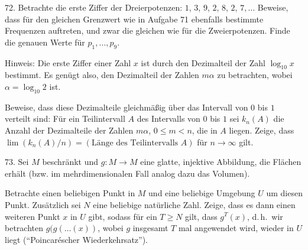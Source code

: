 \begin{problem}{72.}
	Betrachte die erste Ziffer der Dreierpotenzen: $1$, $3$, $9$, $2$, $8$, $2$, $7, \dotsc$ Beweise, dass für den gleichen Grenzwert wie in Aufgabe 71 ebenfalls bestimmte Frequenzen auftreten, und zwar die gleichen wie für die Zweierpotenzen. Finde die genauen Werte für $p_1, \dotsc, p_9$.
	\begin{note}{Hinweis:}
		Die erste Ziffer einer Zahl $x$ ist durch den Dezimalteil der Zahl $\log_{10} x$ bestimmt. Es genügt also, den Dezimalteil der Zahlen $m \alpha$ zu betrachten, wobei $\alpha=\log_{10} 2$ ist.
	\end{note}
	Beweise, dass diese Dezimalteile gleichmäßig über das Intervall von $0$ bis $1$ verteilt sind: Für ein Teilintervall $A$ des Intervalls von $0$ bis $1$ sei $k_n(A)$ die Anzahl der Dezimalteile der Zahlen $m\alpha$, $0 \leqslant m < n$, die in $A$ liegen. Zeige, dass $\lim(k_n(A)/n)=(\text{Länge des Teilintervalls $A$})$ für $n\rightarrow \infty$ gilt.
\end{problem}

\begin{problem}{73.}
	Sei $M$ beschränkt und $g\colon M \to M$ eine glatte, injektive Abbildung, die Flächen erhält (bzw. im mehrdimensionalen Fall analog dazu das Volumen).
	
	Betrachte einen beliebigen Punkt in $M$ und eine beliebige Umgebung $U$ um diesen Punkt. Zusätzlich sei $N$ eine beliebige natürliche Zahl.
	Zeige, dass es dann einen weiteren Punkt $x$ in $U$ gibt, sodass für ein $T\geq N$ gilt, dass $g^T (x)$, d.\,h.\ wir betrachten $g(g(\dots (x))$, wobei $g$ insgesamt $T$ mal angewendet wird, wieder in $U$ liegt (\enquote{Poincaréscher Wiederkehrsatz}).
\end{problem}

